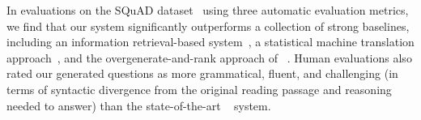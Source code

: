 \documentclass[11pt,a4paper]{article}
\begin{document}
In evaluations on the SQuAD dataset~\cite{rajpurkar2016squad} using three automatic 
evaluation metrics,  we find that our system 
significantly
outperforms a collection of strong baselines, including an information retrieval-based system~\cite{robertson1994bm25}, 
a statistical machine translation approach~\cite{koehn2007moses}, and the overgenerate-and-rank  approach of ~. 
Human evaluations also rated our generated questions as more grammatical, fluent, and challenging (in terms of syntactic divergence from the original reading passage and reasoning needed to answer) than the state-of-the-art ~ system.



 
    
   

\end{document}

